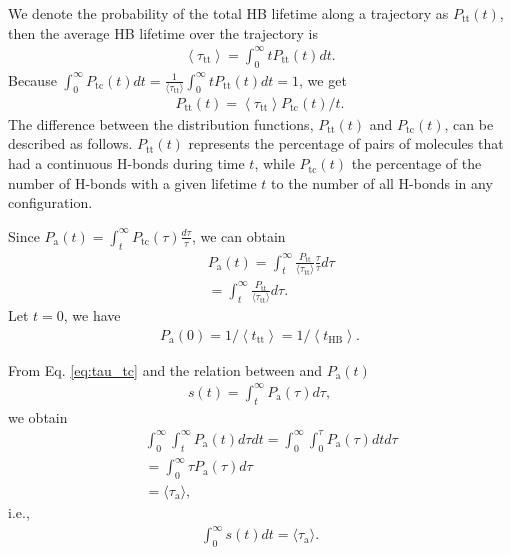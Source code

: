 {We denote the probability of the total HB lifetime along a trajectory as $P_{\mathrm{tt}}(t)$,
then the average HB lifetime over the trajectory is
\begin{eqnarray}
\left\langle\tau_{\mathrm{tt}}\right\rangle=\int_{0}^{\infty} t P_{\mathrm{tt}}(t) d t.
\label{eq:relation_tau_tt}
\end{eqnarray}
Because $\int_{0}^{\infty} P_{\mathrm{tc}}(t) d t=\frac{1}{\langle \tau_\text{tt}\rangle} \int_{0}^{\infty} t P_{\mathrm{tt}}(t) d t = 1$, 
we get 
\begin{eqnarray}
P_{\mathrm{tt}}(t)=\left\langle \tau_{\mathrm{tt}}\right\rangle P_{\mathrm{tc}}(t) / t.
\label{eq:relation_P_tt--P_tc}
\end{eqnarray}
The difference between the distribution functions, $P_{\mathrm{tt}}(t)$ and $P_{\mathrm{tc}}(t)$, can be described as follows.
$P_{\mathrm{tt}}(t)$ represents the percentage of pairs of molecules that had a continuous H-bonds during time $t$, 
while $P_{\mathrm{tc}}(t)$ the percentage of the number of H-bonds with a given lifetime $t$ 
to the number of all H-bonds in any configuration\cite{Voloshin2009}.

Since $P_{\mathrm{a}}(t)=\int_{t}^{\infty} P_{\mathrm{tc}}(\tau) \frac{d \tau}{\tau}$,
we can obtain
\begin{eqnarray}
&& P_{\mathrm{a}}(t)=\int_t^\infty \frac{P_\text{tt}}{\langle\tau_\text{tt}\rangle} \frac{\tau}{\tau} d\tau \nonumber \\
&& =  \int_t^\infty \frac{P_\text{tt}}{\langle\tau_\text{tt}\rangle}d\tau. \nonumber
\label{eq:P_a}
\end{eqnarray}
Let $t=0$, we have 
\begin{eqnarray}
P_{\mathrm{a}}(0)=1 /\left\langle t_{\mathrm{tt}}\right\rangle = 1 /\left\langle t_{\mathrm{HB}}\right\rangle.
\label{eq:P_a0}
\end{eqnarray}

From Eq. \ref{eq:tau_tc} and the relation between \SHB and $P_{\mathrm{a}}(t)$
\begin{eqnarray}
s(t)=\int_{t}^{\infty} P_{\mathrm{a}}(\tau) d \tau,
\label{eq:P_a}
\end{eqnarray}
we obtain
%
\begin{eqnarray}
&&\int_{0}^{\infty} \int_{t}^{\infty} P_\text{a}(t) d \tau d t = \int_{0}^{\infty} \int_{0}^{\tau} P_\text{a}(\tau) d t d \tau \nonumber \\
&& = \int_{0}^{\infty} \tau P_\text{a}(\tau) d \tau \nonumber \\
&& = \langle \tau_{\mathrm{a}} \rangle, \nonumber
\end{eqnarray}
i.e., 
\begin{eqnarray}
\int_{0}^{\infty} s(t) d t = \langle \tau_{\mathrm{a}} \rangle.
\label{eq:int_Ca}
\end{eqnarray}
}
